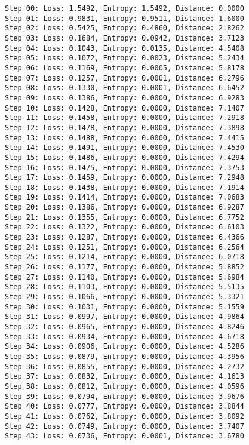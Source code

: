\documentclass[11pt]{article}
\begin{document}
    \begin{Verbatim}[commandchars=\\\{\}]
Step 00: Loss: 1.5492, Entropy: 1.5492, Distance: 0.0000
Step 01: Loss: 0.9831, Entropy: 0.9511, Distance: 1.6000
Step 02: Loss: 0.5425, Entropy: 0.4860, Distance: 2.8262
Step 03: Loss: 0.1684, Entropy: 0.0942, Distance: 3.7123
Step 04: Loss: 0.1043, Entropy: 0.0135, Distance: 4.5408
Step 05: Loss: 0.1072, Entropy: 0.0023, Distance: 5.2434
Step 06: Loss: 0.1169, Entropy: 0.0005, Distance: 5.8178
Step 07: Loss: 0.1257, Entropy: 0.0001, Distance: 6.2796
Step 08: Loss: 0.1330, Entropy: 0.0001, Distance: 6.6452
Step 09: Loss: 0.1386, Entropy: 0.0000, Distance: 6.9283
Step 10: Loss: 0.1428, Entropy: 0.0000, Distance: 7.1407
Step 11: Loss: 0.1458, Entropy: 0.0000, Distance: 7.2918
Step 12: Loss: 0.1478, Entropy: 0.0000, Distance: 7.3898
Step 13: Loss: 0.1488, Entropy: 0.0000, Distance: 7.4415
Step 14: Loss: 0.1491, Entropy: 0.0000, Distance: 7.4530
Step 15: Loss: 0.1486, Entropy: 0.0000, Distance: 7.4294
Step 16: Loss: 0.1475, Entropy: 0.0000, Distance: 7.3753
Step 17: Loss: 0.1459, Entropy: 0.0000, Distance: 7.2948
Step 18: Loss: 0.1438, Entropy: 0.0000, Distance: 7.1914
Step 19: Loss: 0.1414, Entropy: 0.0000, Distance: 7.0683
Step 20: Loss: 0.1386, Entropy: 0.0000, Distance: 6.9287
Step 21: Loss: 0.1355, Entropy: 0.0000, Distance: 6.7752
Step 22: Loss: 0.1322, Entropy: 0.0000, Distance: 6.6103
Step 23: Loss: 0.1287, Entropy: 0.0000, Distance: 6.4366
Step 24: Loss: 0.1251, Entropy: 0.0000, Distance: 6.2564
Step 25: Loss: 0.1214, Entropy: 0.0000, Distance: 6.0718
Step 26: Loss: 0.1177, Entropy: 0.0000, Distance: 5.8852
Step 27: Loss: 0.1140, Entropy: 0.0000, Distance: 5.6984
Step 28: Loss: 0.1103, Entropy: 0.0000, Distance: 5.5135
Step 29: Loss: 0.1066, Entropy: 0.0000, Distance: 5.3321
Step 30: Loss: 0.1031, Entropy: 0.0000, Distance: 5.1559
Step 31: Loss: 0.0997, Entropy: 0.0000, Distance: 4.9864
Step 32: Loss: 0.0965, Entropy: 0.0000, Distance: 4.8246
Step 33: Loss: 0.0934, Entropy: 0.0000, Distance: 4.6718
Step 34: Loss: 0.0906, Entropy: 0.0000, Distance: 4.5286
Step 35: Loss: 0.0879, Entropy: 0.0000, Distance: 4.3956
Step 36: Loss: 0.0855, Entropy: 0.0000, Distance: 4.2732
Step 37: Loss: 0.0832, Entropy: 0.0000, Distance: 4.1613
Step 38: Loss: 0.0812, Entropy: 0.0000, Distance: 4.0596
Step 39: Loss: 0.0794, Entropy: 0.0000, Distance: 3.9676
Step 40: Loss: 0.0777, Entropy: 0.0000, Distance: 3.8844
Step 41: Loss: 0.0762, Entropy: 0.0000, Distance: 3.8092
Step 42: Loss: 0.0749, Entropy: 0.0000, Distance: 3.7407
Step 43: Loss: 0.0736, Entropy: 0.0001, Distance: 3.6780

\end{Verbatim}
\end{document}
